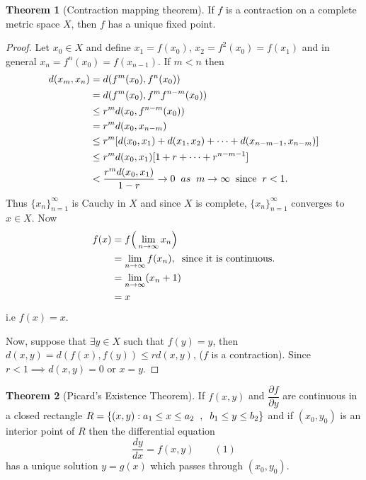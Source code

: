 \documentclass[11pt,a4paper]{article}
\theoremstyle{definition}
\newtheorem{thm}{Theorem}[section]
\begin{document}
\begin{thm}[Contraction mapping theorem]
If $f$ is a contraction on a complete metric space $X$, then $f$ has a unique fixed point.

\end{thm}

\begin{proof}
Let $x_0\in X$ and define $x_1=f(x_0)$, $x_2=f^2(x_0)=f(x_1)$ and in general $x_n=f^n(x_0)=f(x_{n-1})$. If $m<n$ then
\begin{align*}
d(x_m,x_n) &=d(f^m(x_0),f^n(x_0))\\
           &=d(f^m(x_0),f^mf^{n-m}(x_0))\\
           &\leq r^md(x_0,f^{n-m}(x_0))\\
           &=r^md(x_0,x_{n-m})\\
           &\leq r^m[d(x_0,x_1)+d(x_1,x_2)+\cdots+d(x_{n-m-1},x_{n-m})]\\
           &\leq r^md(x_0,x_1)[1+r+\cdots+r^{n-m-1}]\\
           &<\frac{r^md(x_0,x_1)}{1-r}\rightarrow 0\hspace{0.2cm}as\hspace{0.2cm} m\rightarrow \infty \hspace{0.2cm}\text{since}\hspace{0.2cm} r<1.
\end{align*}
Thus $\{x_n\}^{\infty}_{n=1}$ is Cauchy in $X$ and since $X$ is complete, $\{x_n\}^{\infty}_{n=1}$ converges to $x\in X$. Now
\begin{align*}
f(x) &=f\Big(\lim_{n\rightarrow \infty}x_n\Big)\\
     &=\lim_{n\rightarrow \infty}f(x_n), \hspace{0.2cm}\text{since it is continuous.}\\
     &=\lim_{n\rightarrow \infty}(x_n+1)\\
     &=x
\end{align*}  
i.e $f(x)=x$.

Now, suppose that $\exists y\in X$ such that $f(y)=y$, then\hspace{0.2cm}  $d(x,y)=d(f(x),f(y))\leq rd(x,y)$, ($f$ is a contraction).
Since $r<1\implies d(x,y)=0$ or $x=y$.

\end{proof}


\begin{thm}[Picard's Existence Theorem]
If $f(x,y)$ and $\dfrac{\partial f}{\partial y}$ are continuous in a closed rectangle $R=\{(x,y):a_1\leq x\leq a_2\hspace{0.2cm} , \hspace{0.2cm} b_1\leq y\leq b_2\}$ and if $(x_0,y_0)$ is an interior point of $R$ then the differential equation $$\frac{dy}{dx}=f(x,y)\qquad (1)$$ has a unique solution $y=g(x)$ which passes through $(x_0,y_0).$
\end{thm}
\end{document}
